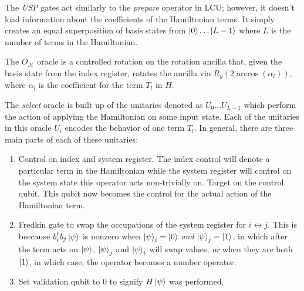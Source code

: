 The \textit{USP} gates act similarly to the \textit{prepare} operator in LCU; however, it doesn't load information about the coefficients of the Hamiltonian terms. It simply creates an equal superposition of basis states from $\ket{0}\dots \ket{L - 1}$ where $L$ is the number of terms in the Hamiltonian. 

The $O_\mathcal{H}$ oracle is a controlled rotation on the rotation ancilla that, given the basis state from the index register, rotates the ancilla via $R_y\left(2\arccos(\alpha_l) \right)$, where $\alpha_l$ is the coefficient for the term $T_l$ in $H$. 

The \textit{select} oracle is built up of the unitaries denoted as $U_0 \dots U_{L - 1}$ which perform the action of applying the Hamiltonian on some input state. Each of the unitaries in this oracle $U_i$ encodes the behavior of one term $T_l$. In general, there are three main parts of each of these unitaries: 
\begin{enumerate}
    \item Control on index and system register. The index control will denote a particular term in the Hamiltonian while the system register will control on the system state this operator acts non-trivially on. Target on the control qubit. This qubit now becomes the control for the actual action of the Hamiltonian term.
    \item Fredkin gate to swap the occupations of the system register for $i \leftrightarrow j$. This is beecause $b^\dagger_i b_j \ket{\psi}$ is nonzero when $\ket{\psi}_i = \ket{0}$ \textit{and} $\ket{\psi}_j = \ket{1}$, in which after the term acts on $\ket{\psi}$, $\ket{\psi}_j$ and $\ket{\psi}_i$ will swap values,  \textit{or} when they are both $\ket{1}$, in which case, the operator becomes a number operator.
    \item Set validation qubit to $0$ to signify $H\ket{\psi}$ was performed. 
\end{enumerate}